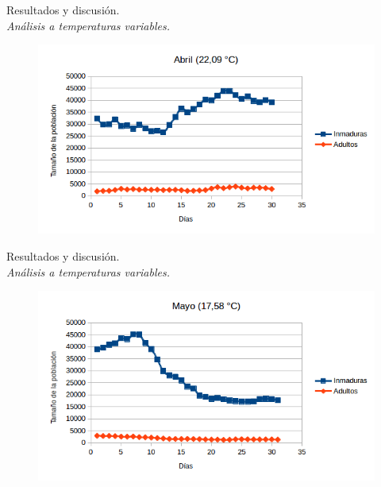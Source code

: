 \begin{frame}[t]{Resultados y discusión.\\\textit{Análisis a temperaturas variables.}}
    \begin{figure}
    \includegraphics[width=\textwidth]{./graphics/py-2010-abril.png}
    \end{figure}
\end{frame}


\begin{frame}[t]{Resultados y discusión.\\\textit{Análisis a temperaturas variables.}}
    \begin{figure}
    \includegraphics[width=\textwidth]{./graphics/py-2010-mayo.png}
    \end{figure}
\end{frame}

